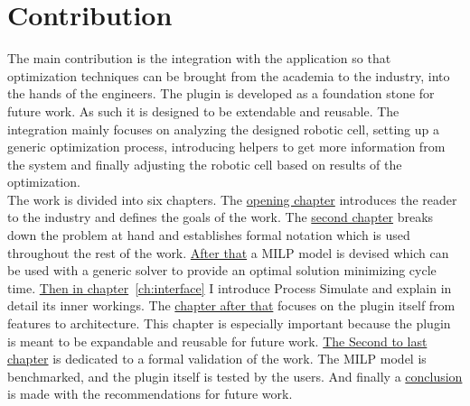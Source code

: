 \section{Contribution}

The main contribution is the integration with the application so that optimization techniques can be brought from the academia to the industry, into the hands of the engineers. The plugin is developed as a foundation stone for future work. As such it is designed to be extendable and reusable. The integration mainly focuses on analyzing the designed robotic cell, setting up a generic optimization process, introducing helpers to get more information from the system and finally adjusting the robotic cell based on results of the optimization. \\

The work is divided into six chapters. The \href{ch:introduction}{opening chapter} introduces the reader to the industry and defines the goals of the work. The \href{ch:problem_statement}{second chapter} breaks down the problem at hand and establishes formal notation which is used throughout the rest of the work. \href{ch:milp_model}{After that} a MILP model is devised which can be used with a generic solver to provide an optimal solution minimizing cycle time. \href{ch:interface}{Then in chapter}~\ref{ch:interface} I introduce Process Simulate and explain in detail its inner workings. The \href{ch:integration}{chapter after that} focuses on the plugin itself from features to architecture. This chapter is especially important because the plugin is meant to be expandable and reusable for future work. \href{ch:experiments}{The Second to last chapter} is dedicated to a formal validation of the work. The MILP model is benchmarked, and the plugin itself is tested by the users. And finally a \href{ch:conclusion}{conclusion} is made with the recommendations for future work.    